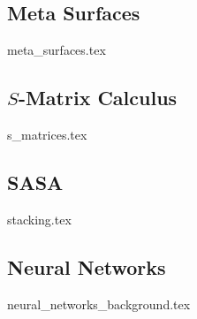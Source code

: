 \subsection{Meta Surfaces} \label{sec:MS}
{meta_surfaces.tex}
\newpage

\subsection{$S$-Matrix Calculus}
{s_matrices.tex}
\newpage

\subsection{SASA}
{stacking.tex}
\newpage

\subsection{Neural Networks} \label{sec:NN_bg}
{neural_networks_background.tex}
